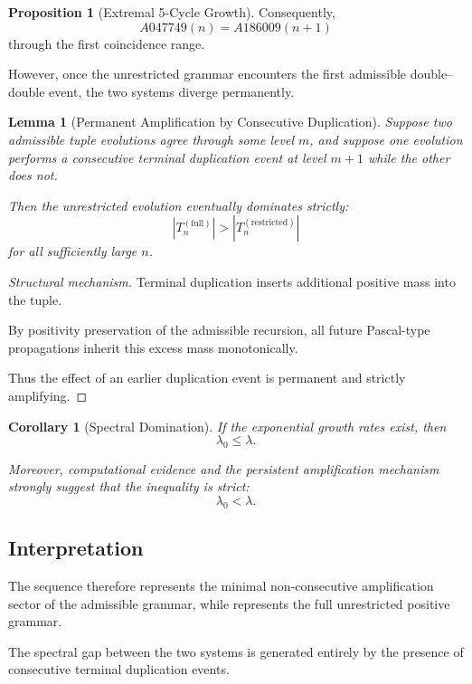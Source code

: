 \documentclass[12pt, oneside]{article}
\numberwithin{equation}{section}
\theoremstyle{definition}
\newtheorem{proposition}{Proposition}[section]
\theoremstyle{plain}
\newtheorem{lemma}[theorem]{Lemma}
\newtheorem{corollary}[theorem]{Corollary}
\theoremstyle{remark}
\begin{document}
\begin{proposition}[Extremal 5-Cycle Growth]
Consequently,
\[
A047749(n)=A186009(n+1)
\]
through the first coincidence range.

However, once the unrestricted grammar encounters the first admissible
double--double event, the two systems diverge permanently.


\begin{lemma}[Permanent Amplification by Consecutive Duplication]
\label{lem:permanent-amplification}
Suppose two admissible tuple evolutions agree through some level \(m\),
and suppose one evolution performs a consecutive terminal duplication
event at level \(m+1\) while the other does not.

Then the unrestricted evolution eventually dominates strictly:
\[
|T_n^{(\mathrm{full})}|
>
|T_n^{(\mathrm{restricted})}|
\]
for all sufficiently large \(n\).
\end{lemma}

\begin{proof}[Structural mechanism]
Terminal duplication inserts additional positive mass into the tuple.

By positivity preservation of the admissible recursion, all future
Pascal-type propagations inherit this excess mass monotonically.

Thus the effect of an earlier duplication event is permanent and
strictly amplifying.
\end{proof}

\begin{corollary}[Spectral Domination]
If the exponential growth rates exist, then
\[
\lambda_0 \le \lambda.
\]

Moreover, computational evidence and the persistent amplification
mechanism strongly suggest that the inequality is strict:
\[
\lambda_0 < \lambda.
\]
\end{corollary}

\subsection{Interpretation}

The sequence  therefore represents the minimal
non-consecutive amplification sector of the admissible grammar, while
 represents the full unrestricted positive grammar.

The spectral gap between the two systems is generated entirely by the
presence of consecutive terminal duplication events.


\end{proposition}
\end{document}
